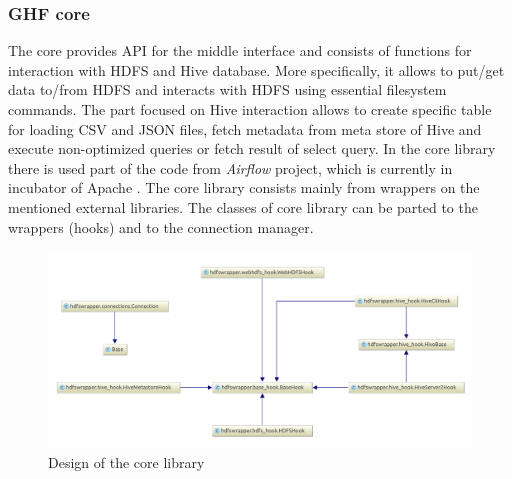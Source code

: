 \documentclass[a4paper,12pt,oneside]{report}
\begin{document}
	\subsubsection{GHF core}
	The core provides API for the middle interface and  consists of functions for
	interaction with HDFS and Hive database. More specifically, it allows to put/get
	data to/from HDFS and interacts with HDFS using essential filesystem commands.
	The part focused on Hive interaction allows to create specific table for
	loading CSV and JSON files, fetch metadata from meta store of Hive and execute
	non-optimized queries or fetch result of select query. In the core library there is
	used part of the code from \textit{Airflow} project, which is currently in
	incubator of Apache \cite{airflow_diff}. 
	The core library consists mainly from wrappers on
	the mentioned external libraries. The classes of core library can be parted to
	the  wrappers (hooks) and to the connection manager. 
	
	\begin{figure}[!htbp]
		\centering
		\includegraphics[width=1\textwidth]{./img/diag1_small.pdf}
		\caption[Core diagram]{\centering Design of the core library }
	\end{figure} 
	
\end{document}
